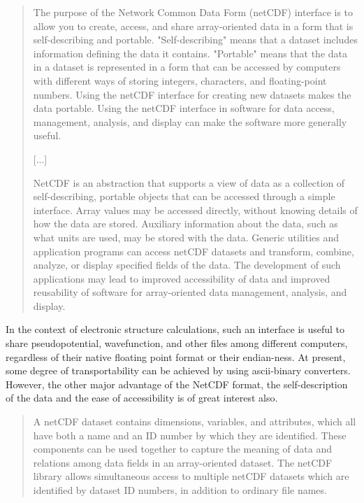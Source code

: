 \documentclass[11pt]{article}
\begin{document}
\begin{quotation}
   The purpose of the Network Common Data Form (netCDF) interface is to
   allow you to create, access, and share array-oriented data in a form 
   that is self-describing and portable. "Self-describing" means that a
   dataset includes information defining the data it contains. "Portable"
   means that the data in a dataset is represented in a form that can be
   accessed by computers with different ways of storing integers,     
   characters, and floating-point numbers. Using the netCDF interface for
   creating new datasets makes the data portable. Using the netCDF 
   interface in software for data access, management, analysis, and  
   display can make the software more generally useful.

   [...] 

   NetCDF is an abstraction that supports a view of data as a collection
   of self-describing, portable objects that can be accessed through a
   simple interface. Array values may be accessed directly, without
   knowing details of how the data are stored. Auxiliary information
   about the data, such as what units are used, may be stored with the
   data. Generic utilities and application programs can access netCDF
   datasets and transform, combine, analyze, or display specified fields
   of the data. The development of such applications may lead to improved
   accessibility of data and improved reusability of software for
   array-oriented data management, analysis, and display. 

\end{quotation}

In the context of electronic structure calculations, such an interface
is useful to share pseudopotential, wavefunction, and other
files among different computers, regardless of their native floating
point format or their endian-ness. At present, some degree of
transportability can be achieved by using ascii-binary converters.
However, the other major advantage of the
NetCDF format, the self-description of the data and the ease of
accessibility is of great interest also.

\begin{quotation}
   A netCDF dataset contains dimensions, variables, and attributes, which
   all have both a name and an ID number by which they are identified.   
   These components can be used together to capture the meaning of data 
   and relations among data fields in an array-oriented dataset. The
   netCDF library allows simultaneous access to multiple netCDF datasets
   which are identified by dataset ID numbers, in addition to ordinary
   file names.           
\end{quotation}
\end{document}

